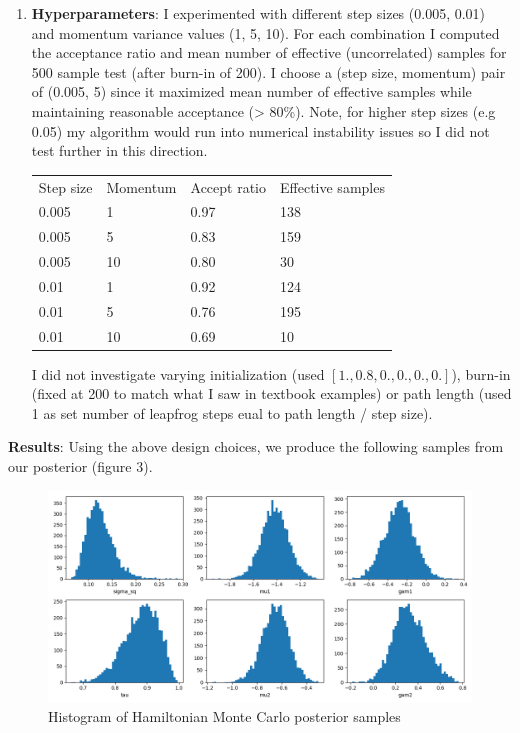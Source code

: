 \documentclass[12pt,letterpaper,twoside]{article}
\begin{document}
\begin{enumerate}[label=(\alph*)]
\item \textbf{Hyperparameters}: I experimented with different step 
sizes (0.005, 0.01) and momentum variance values (1, 5, 10). 
For each combination I computed the acceptance ratio and 
mean number of effective (uncorrelated) samples for 500 sample test (after 
burn-in of 200). I choose a (step size, momentum) pair of 
(0.005, 5) since it maximized mean number of effective samples while 
maintaining reasonable acceptance (> 80\%). Note, for higher step sizes 
(e.g 0.05) my algorithm would run into numerical instability issues 
so I did not test further in this direction.

\begin{table}[H]
    \centering
    \begin{tabular}{llll}
        Step size    & Momentum     & Accept ratio      & Effective samples     \\
        0.005        & 1            & 0.97              & 138                   \\ 
        0.005        & 5            & 0.83              & 159                   \\
        0.005        & 10           & 0.80              & 30                    \\
        0.01         & 1            & 0.92              & 124                   \\
        0.01         & 5            & 0.76              & 195                   \\
        0.01         & 10           & 0.69              & 10                    \\    
    \end{tabular}
\end{table}

I did not investigate varying initialization (used $[1., 0.8, 0., 0., 0., 0.]$), 
burn-in (fixed at 200 to match what I saw in textbook examples) or path length
(used 1 as set number of leapfrog steps eual to path length / step size).
\end{enumerate}

\textbf{Results}: Using the above design choices, we produce the following 
samples from our posterior (figure 3).
\begin{figure}[H]
    \centering
    \includegraphics[scale=0.55]{hmc_sampled_histogram.png}
    \vspace*{-10mm}
    \caption{Histogram of Hamiltonian Monte Carlo posterior samples}
\end{figure}
\end{document}
